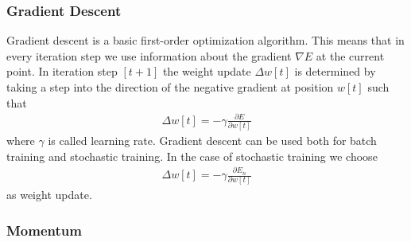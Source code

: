 \subsubsection{Gradient Descent}

Gradient descent is a basic first-order optimization algorithm. This means that in every iteration step we use information about the gradient $\nabla E$ at the current point. In iteration step $[t + 1]$ the weight update $\Delta w[t]$ is determined by taking a step into the direction of the negative gradient at position $w[t]$ such that
\begin{align}
\Delta w[t] = - \gamma \frac{\partial E}{\partial w[t]}
\end{align}
where $\gamma$ is called learning rate. Gradient descent can be used both for batch training and stochastic training\cite[p.~240-241]{Bishop:2006}. In the case of stochastic training we choose
\begin{align}
\Delta w[t] = - \gamma \frac{\partial E_n}{\partial w[t]}
\end{align}
as weight update.

\subsubsection{Momentum}

